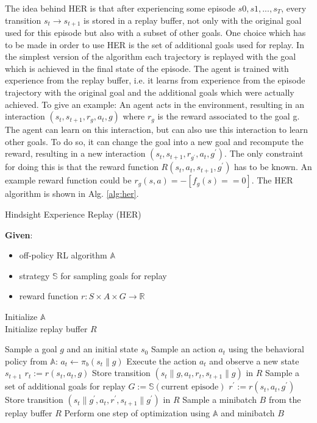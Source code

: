 \documentclass[conference]{IEEEtran}
\begin{document}
The idea behind HER is that after experiencing some episode $s0, s1, ..., s_T$, every transition $s_t \to s_{t+1}$ is stored in a replay buffer, not only with the original goal used for this episode but also with a subset of other goals. One choice which has to be made in order to use HER is the set of additional goals used for replay. In the simplest version of the algorithm each trajectory is replayed with the goal which is achieved in the final state of the episode. The agent is trained with experience from the replay buffer, i.e. it learns from experience from the episode trajectory with the original goal and the additional goals which were actually achieved. To give an example: An agent acts in the environment, resulting in an interaction $(s_t, s_{t+1}, r_g, a_t, g)$ where $r_g$ is the reward associated to the goal g. The agent can learn on this interaction, but can also use this interaction to learn other goals. To do so, it can change the goal into a new goal and recompute the reward, resulting in a new interaction $(s_t, s_{t+1}, r_{g^{\prime}}, a_t, g^{\prime})$. The only constraint for doing this is that the reward function $R(s_t, a_t, s_{t+1}, g^{\prime})$ has to be known. An example reward function could be $r_g(s, a) = -[f_g(s) == 0]$. The HER algorithm is shown in Alg. \ref{alg:her}.
\begin{algorithm}
\caption{Hindsight Experience Replay (HER)}
\label{alg:her}
\textbf{Given}:
\begin{itemize}
    \item off-policy RL algorithm $\mathbb{A}$
    \item strategy $\mathbb{S}$ for sampling goals for replay
    \item reward function $r: S \times A \times G \to \mathbb{R}$
\end{itemize}
Initialize $\mathbb{A}$ \\
Initialize replay buffer $R$
\begin{algorithmic}
    \STATE Sample a goal $g$ and an initial state $s_0$
        \STATE Sample an action $a_t$ using the behavioral policy from $\mathbb{A}$: 
        \STATE \text{ }\text{ }\text{ }\text{ }$a_t \leftarrow \pi_b(s_{t}\|g)$
        \STATE Execute the action $a_t$ and observe a new state $s_{t+1}$
    \ENDFOR
        \STATE $r_t := r(s_t,a_t,g)$
        \STATE Store transition $(s_t\|g, a_t, r_t, s_{t+1}\|g)$ in $R$
        \STATE Sample a set of additional goals for replay $G:=\mathbb{S}(\text{current episode})$
            \STATE $r^{\prime} := r(s_t,a_t,g^{\prime})$
            \STATE Store transition $(s_t\|g^{\prime}, a_t, r^{\prime}, s_{t+1}\|g^{\prime})$ in $R$
        \ENDFOR
    \ENDFOR
        \STATE Sample a minibatch $B$ from the replay buffer $R$
        \STATE Perform one step of optimization using $\mathbb{A}$ and minibatch $B$
    \ENDFOR
\ENDFOR
\end{algorithmic}
\end{algorithm}
\end{document}
